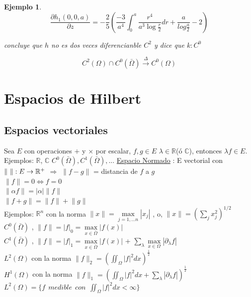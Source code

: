 \documentclass[a4paper,10pt]{book}
\newtheorem{ejemplo}{Ejemplo}
\begin{document}
\begin{enumerate}
\begin{ejemplo}
\[\frac{\partial h_1(0,0,a)}{\partial z} =  -\frac{2}{5} \left(  \frac{-3}{a^4} \int_0^a \frac{r^4}{ a^3 \log \frac{r}{2} }  dr + \frac{a}{log\frac{a}{2}  } -2 \right)
\]

concluye que $h$ no es dos veces diferencianble $C^2$ y dice que $k: C^0$ 


\[
C^2 (\Omega) \cap  C^0 (\bar{\Omega}) \overset{\Delta}{\rightarrow} C^0(\Omega)
\]
 
\end{ejemplo}

\end{enumerate}



\chapter{Espacios de Hilbert}

\section{Espacios vectoriales}
Sea $E$ con operaciones $+$ y $\times$  por escalar, $f,g \in E$  $\lambda\in \mathbb{R}$(ó $\mathbb{C}$),
entonces   $\lambda f \in E$.
Ejemplos:  $\mathbb{R}$, $\mathbb{C}$  $C^0(\bar{\Omega}),C^1(\bar{\Omega}),...$
\underline{Espacio Normado} : E vectorial con $\Arrowvert \ \Arrowvert:E\rightarrow \mathbb{R}^{+}$
$\Rightarrow$  $\lVert f-g \rVert$ = distancia de $f$ a $g$\\
$\lVert f \rVert =0  \Leftrightarrow f = 0 $ \\
$\lVert \alpha f \rVert =  | \alpha |\lVert f \rVert$ \\ 
$\lVert  f + g  \rVert =  \lVert f \rVert +\lVert g  \rVert$ \\ 
Ejemplos: $\mathbb{R}^n$ con la norma $\lVert x \rVert= \underset{j=1,... n}{\max} |x_j|$ , o, $\lVert x\rVert=\left( \sum\limits_j x_j^ 2 \right) ^{1/2}$\\
$C^0(\bar{\Omega})$ , $\lVert f \rVert = |f|_0 = \underset{x\in \bar{\Omega} }{\max} | f(x)|$\\
$C^1(\bar{\Omega})$ , $\lVert f \rVert = |f|_1 = \underset{x\in \bar{\Omega} }{\max} | f(x)|$ + 
$\underset{\lambda}{\sum\limits} \underset{x\in\Omega }{\max} \left| \partial_{\lambda} f \right|$ \\
$L^2(\Omega)$ con la norma $\lVert f \rVert_2= \left( \iint_\Omega |f|^2 dx \right)^\frac{1}{2}$\\ 
$H^1(\Omega)$ con la norma $\lVert f \rVert_1= \left( \iint_\Omega |f|^2 dx + \underset{\lambda}{\sum\limits}  \left| \partial_{\lambda} f \right| \right)^\frac{1}{2}$\\
$L^2(\Omega) = \{ f \ \ medible\ \ con \ \ \iint_\Omega |f|^2 dx< \infty \} $\\  
\end{document}
